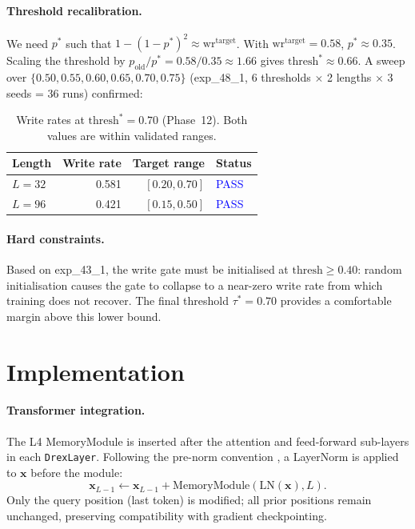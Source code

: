 \documentclass{article}
\newcommand{\bx}{\mathbf{x}}
\begin{document}
\paragraph{Threshold recalibration.}
We need $p^*$ such that $1-(1-p^*)^2 \approx \mathrm{wr}^{\mathrm{target}}$.  With
$\mathrm{wr}^{\mathrm{target}} = 0.58$, $p^* \approx 0.35$.  Scaling the threshold by
$p_{\mathrm{old}}/p^* = 0.58/0.35 \approx 1.66$ gives $\mathrm{thresh}^* \approx 0.66$.
A sweep over $\{0.50, 0.55, 0.60, 0.65, 0.70, 0.75\}$ (exp\_48\_1, 6 thresholds
$\times$ 2 lengths $\times$ 3 seeds = 36 runs) confirmed:

\begin{table}[h]
  \centering
  \small
  \caption{Write rates at $\mathrm{thresh}^*=0.70$ (Phase~12).  Both values are within
    validated ranges.}
  \label{tab:writerate}
  \begin{tabular}{lrrl}
    \toprule
    Length & Write rate & Target range & Status \\
    \midrule
    $L=32$  & 0.581 & $[0.20, 0.70]$ & \textcolor{blue}{PASS} \\
    $L=96$  & 0.421 & $[0.15, 0.50]$ & \textcolor{blue}{PASS} \\
    \bottomrule
  \end{tabular}
\end{table}

\paragraph{Hard constraints.}
Based on exp\_43\_1, the write gate must be initialised at $\mathrm{thresh} \geq 0.40$:
random initialisation causes the gate to collapse to a near-zero write rate from which
training does not recover.  The final threshold $\tau^* = 0.70$ provides a comfortable
margin above this lower bound.

\section{Implementation}
\label{sec:impl}

\paragraph{Transformer integration.}
The L4 MemoryModule is inserted after the attention and feed-forward sub-layers in each
\texttt{DrexLayer}.  Following the pre-norm convention \citep{xiong2020layer}, a
LayerNorm is applied to $\bx$ before the module:
\begin{equation}
  \bx_{L-1} \leftarrow \bx_{L-1}
    + \mathrm{MemoryModule}\!\left(\mathrm{LN}(\bx), L\right).
\end{equation}
Only the query position (last token) is modified; all prior positions remain unchanged,
preserving compatibility with gradient checkpointing.
\end{document}
